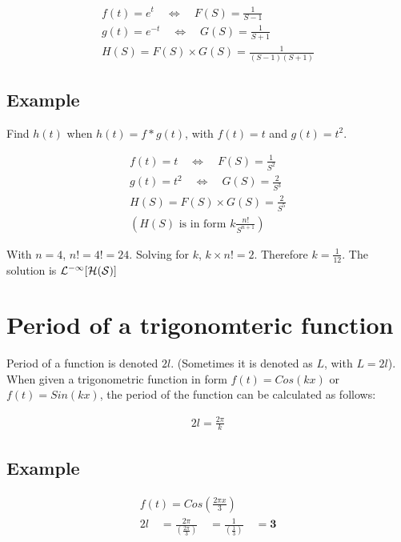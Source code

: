 \documentclass[12pt, a4paper]{article}
\begin{document}
\begin{eqnarray}
f(t) = e^{t} \quad \Leftrightarrow \quad F(S)= \frac{1}{S-1}
 \nonumber\\
g(t) = e^{-t} \quad \Leftrightarrow \quad G(S)= \frac{1}{S+1}
 \nonumber\\
H(S) = F(S)\times G(S) = \frac{1}{(S-1)(S+1)}
 \nonumber
\end{eqnarray}
\subsection{Example}
Find $h(t)$ when $h(t) = f*g(t)$, with $f(t)= t$ and $g(t)=
t^2$.\newline

\begin{eqnarray}
f(t) = t \quad \Leftrightarrow \quad F(S)= \frac{1}{S^2}
 \nonumber\\
g(t) = t^2 \quad \Leftrightarrow \quad G(S)= \frac{2}{S^3}
 \nonumber\\
H(S) = F(S)\times G(S) = \frac{2}{S^5}
 \nonumber\\
(H(S) \mbox{ is in form }  k\frac{n!}{S^{n+1}} )
 \nonumber
\end{eqnarray}

With $n=4$, $n!= 4! = 24$. Solving for $k$, $k \times n! = 2$.
Therefore $k=\frac{1}{12}$. The solution is $\cal{L}^{-1}[H(S)]$

\section{Period of a trigonomteric function}
Period of a function is denoted $2l$. (Sometimes it is denoted as
$L$, with $L=2l$). \newline When given a trigonometric function in
form $f(t) = Cos(kx)$ or $f(t)= Sin(kx)$, the period of the
function can be calculated as follows:

\begin{eqnarray}
2l = \frac{2 \pi}{k}\nonumber
\end{eqnarray}


\subsection{Example}
\begin{eqnarray}f(t) = Cos(\frac{2 \pi x}{3}) \nonumber\\
2l \quad=\frac{2\pi}{(\frac{2\pi}{3})}\quad =
\frac{1}{(\frac{1}{3})}\quad= \textbf{3}\nonumber
\end{eqnarray}
\end{document}
